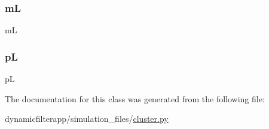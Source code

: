 \subsubsection{\texorpdfstring{mL}{mL}}
{\footnotesize\ttfamily mL\hspace{0.3cm}{\ttfamily [static]}}

\mbox{\label{classdynamicfilterapp_1_1simulation__files_1_1cluster_1_1_clusterk_d_abcc44a80b1ae4089dbfbaf1ac899b904}} 
\subsubsection{\texorpdfstring{pL}{pL}}
{\footnotesize\ttfamily pL\hspace{0.3cm}{\ttfamily [static]}}



The documentation for this class was generated from the following file\+:\begin{DoxyCompactItemize}
\item 
dynamicfilterapp/simulation\+\_\+files/\mbox{\hyperlink{cluster_8py}{cluster.\+py}}\end{DoxyCompactItemize}
